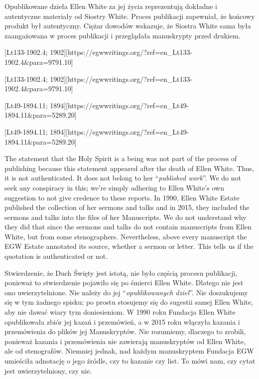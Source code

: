 Opublikowane dzieła Ellen White za jej życia reprezentują dokładne i autentyczne materiały od Siostry White. Proces publikacji zapewniał, że końcowy produkt był autentyczny. Ciężar dowodów wskazuje, że Siostra White sama była zaangażowana w proces publikacji i przeglądała manuskrypty przed drukiem.


[Lt133-1902.4; 1902][https://egwwritings.org/?ref=en\_Lt133-1902.4&para=9791.10]


[Lt133-1902.4; 1902][https://egwwritings.org/?ref=en\_Lt133-1902.4&para=9791.10]


[Lt49-1894.11; 1894][https://egwwritings.org/?ref=en\_Lt49-1894.11&para=5289.20]


[Lt49-1894.11; 1894][https://egwwritings.org/?ref=en\_Lt49-1894.11&para=5289.20]


The statement that the Holy Spirit is a being was not part of the process of publishing because this statement appeared after the death of Ellen White. Thus, it is not authenticated. It does not belong to her “\textit{published work}”. We do not seek any conspiracy in this; we’re simply adhering to Ellen White’s own suggestion to not give credence to these reports. In 1990, Ellen White Estate published the collection of her sermons and talks and in 2015, they included the sermons and talks into the files of her Manuscripts. We do not understand why they did that since the sermons and talks do not contain manuscripts from Ellen White, but from some stenographers. Nevertheless, above every manuscript the EGW Estate annotated its source, whether a sermon or letter. This tells us if the quotation is authenticated or not.


Stwierdzenie, że Duch Święty jest istotą, nie było częścią procesu publikacji, ponieważ to stwierdzenie pojawiło się po śmierci Ellen White. Dlatego nie jest ono uwierzytelnione. Nie należy do jej “\textit{opublikowanych dzieł}”. Nie doszukujemy się w tym żadnego spisku; po prostu stosujemy się do sugestii samej Ellen White, aby nie dawać wiary tym doniesieniom. W 1990 roku Fundacja Ellen White opublikowała zbiór jej kazań i przemówień, a w 2015 roku włączyła kazania i przemówienia do plików jej Manuskryptów. Nie rozumiemy, dlaczego to zrobili, ponieważ kazania i przemówienia nie zawierają manuskryptów od Ellen White, ale od stenografów. Niemniej jednak, nad każdym manuskryptem Fundacja EGW umieściła adnotację o jego źródle, czy to kazanie czy list. To mówi nam, czy cytat jest uwierzytelniony, czy nie.


